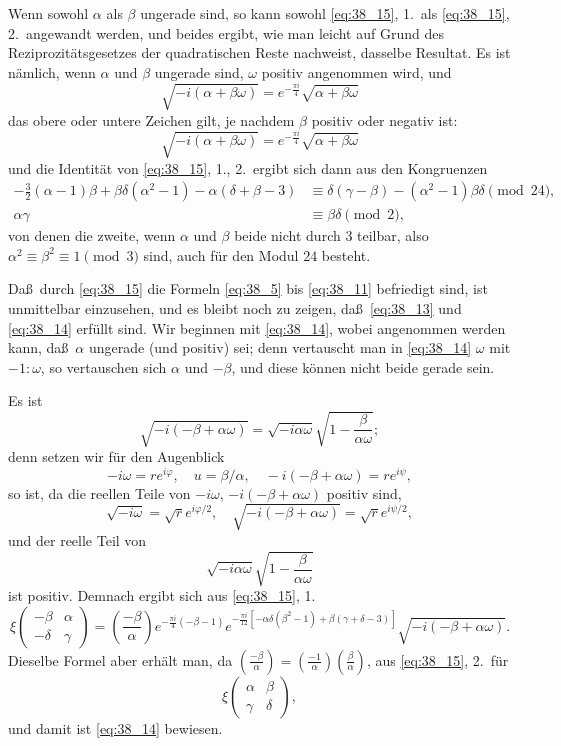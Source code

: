 \documentclass[12pt,a4paper]{article}
\begin{document}
Wenn sowohl $\alpha$ als $\beta$ ungerade sind, so kann sowohl \eqref{eq:38_15}, 1.\ als \eqref{eq:38_15}, 2.\ angewandt werden, und beides ergibt, wie man leicht auf Grund des Reziprozit\"atsgesetzes der quadratischen Reste nachweist, dasselbe Resultat. Es ist n\"amlich, wenn $\alpha$ und $\beta$ ungerade sind, $\omega$ positiv angenommen wird, und
\[
\sqrt{-i(\alpha+\beta\omega)} = e^{-\frac{\pi i}{4}}\sqrt{\alpha+\beta\omega}
\]
das obere oder untere Zeichen gilt, je nachdem $\beta$ positiv oder negativ ist:
\[
\sqrt{-i(\alpha+\beta\omega)} = e^{-\frac{\pi i}{4}}\sqrt{\alpha+\beta\omega}
\]
und die Identit\"at von \eqref{eq:38_15}, 1., 2.\ ergibt sich dann aus den Kongruenzen
\begin{align*}
-\tfrac{3}{2}(\alpha-1)\beta + \beta\delta(\alpha^2-1) - \alpha(\delta+\beta-3) &\equiv \delta(\gamma-\beta) - (\alpha^2-1)\beta\delta\pmod{24},\\
\alpha\gamma &\equiv \beta\delta\pmod{2},
\end{align*}
von denen die zweite, wenn $\alpha$ und $\beta$ beide nicht durch $3$ teilbar, also $\alpha^2\equiv\beta^2\equiv 1\pmod{3}$ sind, auch f\"ur den Modul $24$ besteht.

Da\ss\ durch \eqref{eq:38_15} die Formeln \eqref{eq:38_5} bis \eqref{eq:38_11} befriedigt sind, ist unmittelbar einzusehen, und es bleibt noch zu zeigen, da\ss\ \eqref{eq:38_13} und \eqref{eq:38_14} erf\"ullt sind. Wir beginnen mit \eqref{eq:38_14}, wobei angenommen werden kann, da\ss\ $\alpha$ ungerade (und positiv) sei; denn vertauscht man in \eqref{eq:38_14} $\omega$ mit $-1:\omega$, so vertauschen sich $\alpha$ und $-\beta$, und diese k\"onnen nicht beide gerade sein.

Es ist
\[
\sqrt{-i(-\beta+\alpha\omega)} = \sqrt{-i\alpha\omega}\sqrt{1-\frac{\beta}{\alpha\omega}};
\]
denn setzen wir f\"ur den Augenblick
\[
-i\omega = re^{i\varphi},\quad u = \beta/\alpha,\quad -i(-\beta+\alpha\omega) = re^{i\psi},
\]
so ist, da die reellen Teile von $-i\omega$, $-i(-\beta+\alpha\omega)$ positiv sind,
\[
\sqrt{-i\omega} = \sqrt{r}e^{i\varphi/2},\quad
\sqrt{-i(-\beta+\alpha\omega)} = \sqrt{r}e^{i\psi/2},
\]
und der reelle Teil von
\[
\sqrt{-i\alpha\omega}\sqrt{1-\frac{\beta}{\alpha\omega}}
\]
ist positiv. Demnach ergibt sich aus \eqref{eq:38_15}, 1.
\[
\xi\begin{pmatrix}-\beta&\alpha\\-\delta&\gamma\end{pmatrix}
= \left(\frac{-\beta}{\alpha}\right)e^{-\frac{\pi i}{4}(-\beta-1)}e^{-\frac{\pi i}{12}[-\alpha\delta(\beta^2-1)+\beta(\gamma+\delta-3)]}\sqrt{-i(-\beta+\alpha\omega)}.
\]
Dieselbe Formel aber erh\"alt man, da $\left(\frac{-\beta}{\alpha}\right)=\left(\frac{-1}{\alpha}\right)\left(\frac{\beta}{\alpha}\right)$, aus \eqref{eq:38_15}, 2.\ f\"ur
\[
\xi\begin{pmatrix}\alpha&\beta\\\gamma&\delta\end{pmatrix},
\]
und damit ist \eqref{eq:38_14} bewiesen.
\end{document}
